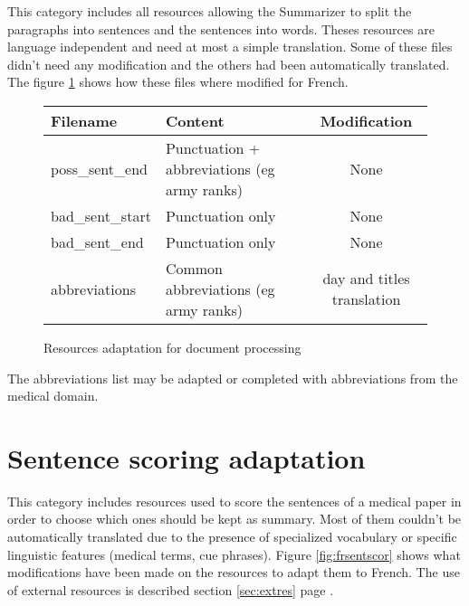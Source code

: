 \documentclass[a4paper,10pt]{article}
\begin{document}
This category includes all resources allowing the Summarizer to split
the paragraphs into sentences and the sentences into words. Theses
resources are language independent and need at most a simple
translation. Some of these files didn't need any modification and the
others had been automatically translated. The figure
\ref{fig:frdocproc} shows how these files where modified for French.

\begin{figure}[H]
  \centering
  \begin{tabular}[h]{|l|l|c|}
    \hline
    Filename & Content & Modification\\
    \hline
    poss\_sent\_end & Punctuation + abbreviations (eg army ranks) &
    None\\
    bad\_sent\_start & Punctuation only & None\\
    bad\_sent\_end & Punctuation only & None\\
    abbreviations & Common abbreviations (eg army ranks) & day and
    titles translation\\
    \hline
  \end{tabular}
  \caption{Resources adaptation for document processing}
  \label{fig:frdocproc}
\end{figure}

The abbreviations list may be adapted or completed with abbreviations
from the medical domain.



\section{Sentence scoring adaptation}
\label{sec:sentscor}

This category includes resources used to score the sentences of a
medical paper in order to choose which ones should be kept as
summary. Most of them couldn't be automatically translated due to the
presence of specialized vocabulary or specific linguistic features
(medical terms, cue phrases). Figure \ref{fig:frsentscor} shows what
modifications have been made on the resources to adapt them to
French. The use of external resources is described section
\ref{sec:extres} page \pageref{sec:extres}.
\end{document}
